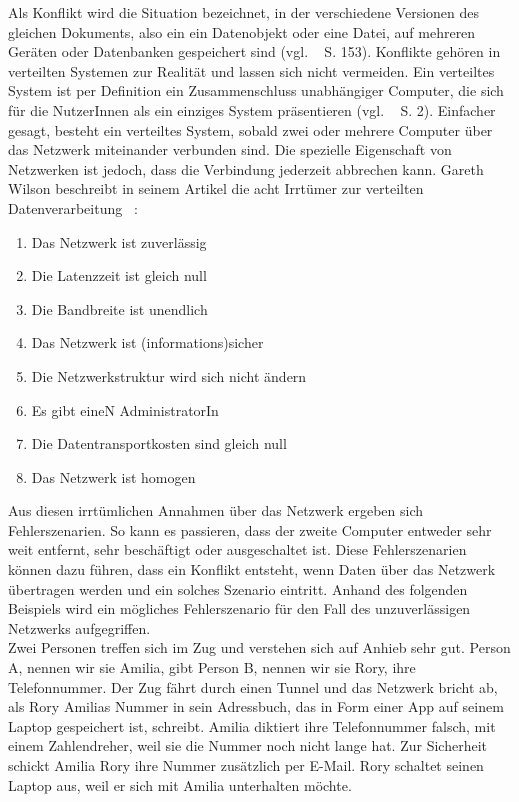 Als Konflikt wird die Situation bezeichnet, in der verschiedene Versionen des gleichen Dokuments, also ein ein Datenobjekt oder eine Datei, auf mehreren Geräten oder Datenbanken gespeichert sind (vgl. ~\cite{couchDB} S. 153).
Konflikte gehören in verteilten Systemen zur Realität und lassen sich nicht vermeiden.
Ein verteiltes System ist per Definition ein Zusammenschluss unabhängiger Computer, die sich für die NutzerInnen als ein einziges System präsentieren (vgl. ~\cite{tanenbaum} S. 2).
Einfacher gesagt, besteht ein verteiltes System, sobald zwei oder mehrere Computer über das Netzwerk miteinander verbunden sind.
Die spezielle Eigenschaft von Netzwerken ist jedoch, dass die Verbindung jederzeit abbrechen kann.
Gareth Wilson beschreibt in seinem Artikel die acht Irrtümer zur verteilten Datenverarbeitung ~\cite{fallacies}:
\begin{enumerate}
  \item Das Netzwerk ist zuverlässig
  \item Die \gls{Latenz}zeit ist gleich null
  \item Die Bandbreite ist unendlich
  \item Das Netzwerk ist (informations)sicher
  \item Die Netzwerkstruktur wird sich nicht ändern
  \item Es gibt eineN AdministratorIn
  \item Die Datentransportkosten sind gleich null
  \item Das Netzwerk ist homogen
\end{enumerate}
Aus diesen irrtümlichen Annahmen über das Netzwerk ergeben sich Fehlerszenarien. So kann es passieren, dass der zweite Computer entweder sehr weit entfernt, sehr beschäftigt oder ausgeschaltet ist. Diese Fehlerszenarien können dazu führen, dass ein Konflikt entsteht, wenn Daten über das Netzwerk übertragen werden und ein solches Szenario eintritt.
Anhand des folgenden Beispiels wird ein mögliches Fehlerszenario für den Fall des unzuverlässigen Netzwerks aufgegriffen.\\
%
Zwei Personen treffen sich im Zug und verstehen sich auf Anhieb sehr gut. Person A, nennen wir sie Amilia, gibt Person B, nennen wir sie Rory, ihre Telefonnummer. Der Zug fährt durch einen Tunnel und das Netzwerk bricht ab, als Rory Amilias Nummer in sein Adressbuch, das in Form einer \gls{App} auf seinem Laptop gespeichert ist, schreibt.
Amilia diktiert ihre Telefonnummer falsch, mit einem Zahlendreher, weil sie die Nummer noch nicht lange hat.
Zur Sicherheit schickt Amilia Rory ihre Nummer zusätzlich per E-Mail. Rory schaltet seinen Laptop aus, weil er sich mit Amilia unterhalten möchte.
